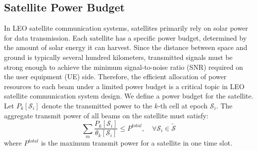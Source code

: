 \subsection{Satellite Power Budget}

In LEO satellite communication systems, satellites primarily rely on solar power for data transmission. Each satellite has a specific power budget, determined by the amount of solar energy it can harvest. Since the distance between space and ground is typically several hundred kilometers, transmitted signals must be strong enough to achieve the minimum signal-to-noise ratio (SNR) required on the user equipment (UE) side. Therefore, the efficient allocation of power resources to each beam under a limited power budget is a critical topic in LEO satellite communication system design.
We define a power budget for the satellite. Let $P_k[\mathcal{S}_i]$ denote the transmitted power to the $k$-th cell at epoch $\mathcal{S}_i$. The aggregate transmit power of all beams on the satellite must satisfy:
\begin{equation}
    \sum_{m} \frac{P_{k}[\mathcal{S}_i]}{\theta_k[\mathcal{S}_i]} \leq P^{total}, \quad \forall \mathcal{S}_i \in \mathcal{\widetilde{S}}
\end{equation}
where $P^{total}$ is the maximum transmit power for a satellite in one time slot.







